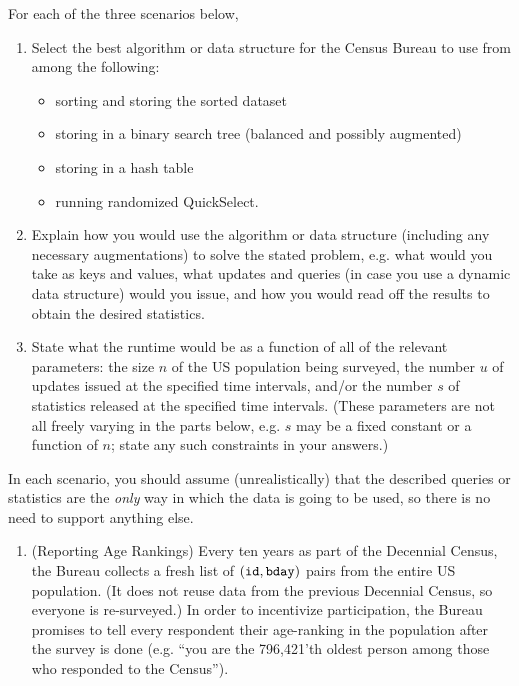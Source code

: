 \documentclass[11pt]{article}
\begin{document}
\begin{enumerate}
    For each of the three scenarios below, 
    \begin{enumerate}
        \item Select the best algorithm or data structure for the Census Bureau to use from among the following: 
        \begin{itemize}
            \item sorting and storing the sorted dataset 
            \item storing in a binary search tree (balanced and possibly augmented)
            \item storing in a hash table
            \item running randomized QuickSelect. 
        \end{itemize}
        \item Explain how you would use the
        algorithm or data structure (including any necessary augmentations) to solve the stated problem, e.g. what would you take as keys and values, what updates and queries (in case you use a dynamic data structure) would you issue, and how you would read off the results to obtain the desired statistics. 
        \item State what the runtime would be as a function of all of the relevant parameters: the size $n$ of the US population being surveyed, the number $u$ of updates issued at the specified time intervals, and/or the number $s$ of statistics released at the specified time intervals.     (These parameters are not all freely varying in the parts below, e.g. $s$ may be a fixed constant or a function of $n$; state any such constraints in your answers.) 
    \end{enumerate}
    In each scenario, you should assume (unrealistically) that the described queries or statistics are the {\em only} way in which the data is going to be used, so there is no need to support anything else.
        
\begin{enumerate}
    \item (Reporting Age Rankings)
    Every ten years as part of the Decennial Census, the Bureau collects a fresh list of $(\texttt{id},\texttt{bday})$ pairs from the entire US population.
    (It does not reuse data from the previous Decennial Census, so everyone is re-surveyed.)
    In order to incentivize participation, the Bureau promises to tell every respondent their age-ranking in the population after the survey is done (e.g. ``you are the 796,421'th oldest person among those who responded to the Census'').
    

\end{enumerate}
\end{enumerate}
\end{document}
